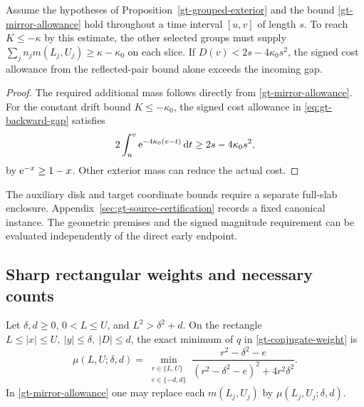 \begin{corollary}
\label{gt-fixed-strip-tube}
Assume the hypotheses of Proposition~\ref{gt-grouped-exterior} and
the bound \eqref{gt-mirror-allowance} hold throughout a time interval
\([u,v]\) of length \(s\). To reach \(K\le-\kappa\) by this estimate,
the other selected groups must supply
\(\sum_j n_jm(L_j,U_j)\ge\kappa-\kappa_0\) on each slice.
If \(D(v)<2s-4\kappa_0s^2\), the signed cost allowance from the
reflected-pair bound alone exceeds the incoming gap.
\end{corollary}
\begin{proof}
The required additional mass follows directly from
\eqref{gt-mirror-allowance}. For the constant drift bound
\(K\le-\kappa_0\), the signed cost allowance in
\eqref{eq:gt-backward-gap} satisfies
\[
 2\int_u^v\mathrm e^{-4\kappa_0(v-t)}\,\mathrm d t
   \ge 2s-4\kappa_0s^2,
\]
by \(\mathrm e^{-x}\ge1-x\). Other exterior mass can reduce the actual cost.
\end{proof}

The auxiliary disk and target coordinate bounds require a separate
full-slab enclosure. Appendix~\ref{sec:gt-source-certification}
records a fixed canonical instance. The geometric premises and
the signed magnitude requirement can be evaluated independently
of the direct early endpoint.

\subsection{Sharp rectangular weights and necessary counts}

\begin{proposition}
\label{gt-sharp-exterior}
Let \(\delta,d\ge0\), \(0<L\le U\), and \(L^2>\delta^2+d\).
On the rectangle \(L\le |x|\le U,\ |y|\le\delta,\ |D|\le d\),
the exact minimum of \(q\) in \eqref{gt-conjugate-weight} is
\begin{equation}
 \mu(L,U;\delta,d)
 =\min_{\substack{r\in\{L,U\}\\ e\in\{-d,d\}}}
 \frac{r^2-\delta^2-e}{(r^2-\delta^2-e)^2+4r^2\delta^2}.
 \label{gt-sharp-weight}
\end{equation}
In \eqref{gt-mirror-allowance} one may replace each \(m(L_j,U_j)\)
by \(\mu(L_j,U_j;\delta,d)\).
\end{proposition}


